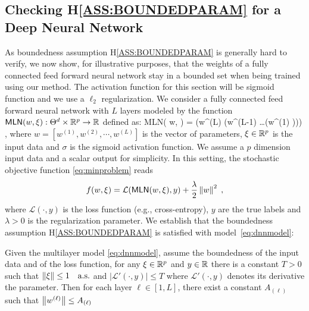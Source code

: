 \documentclass[wcp]{jmlr}
\begin{document}
\vspace{-0.05in}
\subsection{Checking H\ref{ASS:BOUNDEDPARAM}  for a Deep Neural Network}
\vspace{-0.05in}

As boundedness assumption H\ref{ASS:BOUNDEDPARAM} is generally hard to verify, we now show, for illustrative purposes, that the weights of a fully connected feed forward neural network stay in a bounded set when being trained using our method. 
The activation function for this section will be sigmoid function and we use a $\ell_2$ regularization. 
We consider a fully connected feed forward neural network with $L$ layers modeled by the function $\textsf{MLN}(w, \xi): \Theta^d \times \rset^p \to \rset$ defined as:
\beq\label{eq:dnnmodel}
\textsf{MLN}( w, \xi) = \sigma\left(w^{(L)} \sigma\left(w^{(L-1)} \ldots \sigma\left(w^{(1)} \xi \right)\right)\right) \eqsp,
\eeq
where $w = [w^{(1)}, w^{(2)}, \cdots , w^{(L)}]$ is the vector of parameters, $\xi \in \rset^p$ is the input data and $\sigma$ is the sigmoid activation function. We assume a $p$ dimension input data and a scalar output for simplicity.
In this setting, the stochastic objective function \eqref{eq:minproblem} reads 
$$
f(w, \xi) = \mathcal{L}(\textsf{MLN}( w, \xi), y) +\frac{\lambda}{2}\norm{w}^2\eqsp,
$$
where $\mathcal{L}(\cdot, y)$ is the loss function (e.g., cross-entropy), $y$ are the true labels and $\lambda >0$ is the regularization parameter.
We establish that the boundedness assumption H\ref{ASS:BOUNDEDPARAM} is satisfied with model~\eqref{eq:dnnmodel}:
\begin{Lemma}\label{LEM:DNNH2}
Given the multilayer model \eqref{eq:dnnmodel}, assume the boundedness of the input data and of the loss function, \ie for any $\xi \in \rset^p$ and $y \in \rset$ there is a constant $T >0$ such that $\norm{\xi} \leq 1 \quad \textrm{a.s.}$ and $|\mathcal{L}'(\cdot, y)| \leq T$ where $\mathcal{L}'(\cdot, y)$ denotes its derivative \wrt the parameter. Then for each layer $\ell \in [1,L]$, there exist a constant $A_{(\ell)}$ such that $\norm{w^{(\ell)}} \leq A_{(\ell)}$
\end{Lemma}
\end{document}
